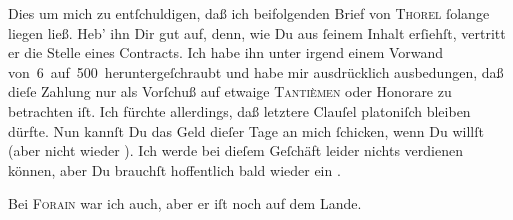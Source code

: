 \pstart
           Dies um mich zu entſchuldigen, daß ich  beifolgenden
               Brief von \textsc{Thorel}{ }ſolange liegen ließ. Heb’ ihn Dir gut auf, denn, wie Du aus{ }ſeinem Inhalt
               erſiehſt, vertritt er die Stelle eines Contracts. Ich habe ihn unter irgend einem
               Vorwand von 6 auf 500 heruntergeſchraubt und habe mir ausdrücklich ausbedungen, daß
               dieſe Zahlung nur als Vorſchuß auf etwaige {\pb}\strikeout{\textcolor{gray}{×}}{ }\textsc{Tantièmen} oder Honorare zu betrachten iſt. Ich fürchte
               allerdings, daß letztere Clauſel platoniſch bleiben dürfte. Nun kannſt Du das Geld
               dieſer Tage an mich{ }ſchicken, wenn Du willſt (aber nicht wieder \label{K_L02785-2v}\label{K_L02785-2}). Ich werde
               bei dieſem Geſchäft leider nichts verdienen können, aber Du brauchſt hoffentlich bald
               wieder ein \label{K_L02785-3v}\label{K_L02785-3}.\pend
           
\pstart
           Bei \textsc{Forain} war ich auch, aber er iſt noch auf {\pb}dem
               Lande.\pend
           
